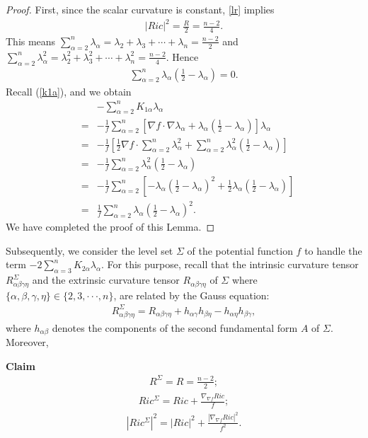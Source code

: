 \documentclass[12pt]{amsart}
\newcommand{\ba}{\begin{eqnarray}}
\newcommand{\ea}{\end{eqnarray}}
\newcommand{\ban}{\begin{eqnarray*}}
\newcommand{\ean}{\end{eqnarray*}}
\begin{document}
	\begin{proof}
		First, since the scalar curvature is constant, \eqref{lr} implies
		\ban
		|Ric|^2=\frac{R}{2}=\frac{n-2}{4}.
		\ean
		This means $\sum_{\alpha=2}^n\lambda_\alpha=\lambda_2+\lambda_3+\cdots+\lambda_n=\frac{n-2}{2}$ and $\sum_{\alpha=2}^n\lambda_\alpha^2=\lambda_2^2+\lambda_3^2+\cdots+\lambda_n^2=\frac{n-2}{4}$. Hence
		\ban
		\sum_{\alpha=2}^n\lambda_\alpha(\frac{1}{2}-\lambda_\alpha)=0.
		\ean
		Recall (\ref{k1a}), and we obtain
		\ban
		&&-\sum_{\alpha=2}^nK_{1\alpha}\lambda_\alpha\\
		&=&-\frac{1}{f}\sum_{\alpha=2}^n
		\left[ \nabla f\cdot \nabla \lambda_\alpha +\lambda_\alpha(\frac{1}{2}-\lambda_\alpha)\right]\lambda_\alpha\\
		&=&-\frac{1}{f}\left[ \frac{1}{2} \nabla f\cdot \sum_{\alpha=2}^n\lambda_\alpha^2
		+\sum_{\alpha=2}^n\lambda_\alpha^2(\frac{1}{2}-\lambda_\alpha) \right] \\
		&=&-\frac{1}{f}\sum_{\alpha=2}^n\lambda_\alpha^2(\frac{1}{2}-\lambda_\alpha) \\
		&=&-\frac{1}{f}\sum_{\alpha=2}^n\left[- \lambda_\alpha(\frac{1}{2}-\lambda_\alpha)^2+\frac{1}{2}\lambda_\alpha(\frac{1}{2}-\lambda_\alpha) \right] \\
		&=&\frac{1}{f}\sum_{\alpha=2}^n \lambda_\alpha(\frac{1}{2}-\lambda_\alpha)^2.
		\ean
		We have completed the proof of this Lemma.
		
	\end{proof}
	
	
	Subsequently, we consider the level set $\Sigma$ of the potential function $f$ to handle the term $-2\sum_{\alpha=3}^n K_{2\alpha}\lambda_\alpha$. For this purpose,
	recall that the intrinsic curvature tensor $R^{\Sigma}_{\alpha \beta \gamma \eta }$ and the extrinsic curvature tensor $R_{\alpha \beta \gamma \eta }$ of ${\Sigma}$ where $\{\alpha,\beta,\gamma,\eta\}\in\{2,3,\cdot\cdot\cdot, n\}$, are related by the Gauss equation:
	\ban
	R^{\Sigma}_{\alpha \beta \gamma \eta }=R_{\alpha \beta \gamma \eta }+h_{\alpha \gamma}h_{\beta \eta}-h_{\alpha \eta }h_{\beta \gamma},
	\ean
	where $h_{\alpha \beta }$ denotes the components of the second fundamental form $A$ of ${\Sigma}$. Moreover,
	
	\smallskip
	\textbf{Claim}
	\ba\label{rsigma}
	R^{\Sigma}=R=\frac{n-2}{2};
	\ea
	\ba\label{ricsigma}
	Ric^{\Sigma}=Ric+\frac{\nabla_{\nabla f} Ric}{f};
	\ea
	\ba\label{ricsigma'}
	|Ric^{\Sigma}|^2=|Ric|^2+\frac{|\nabla_{\nabla f} Ric|^2}{f^2}.
	\ea	
	
\end{document}
